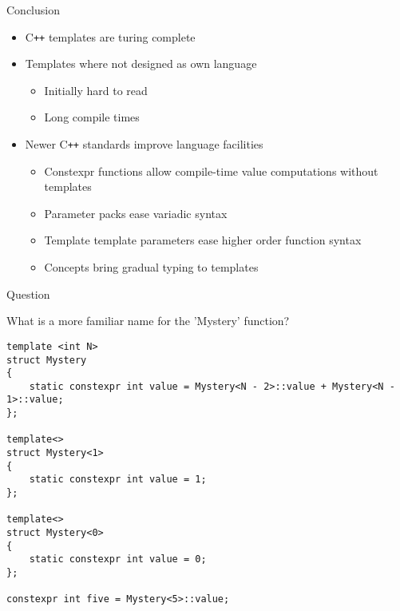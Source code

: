 \documentclass[aspectratio=169]{beamer}
\begin{document}

\begin{frame}{Conclusion}
    \begin{itemize}
        \item C\texttt{++} templates are turing complete
        \item Templates where not designed as own language
        
        \begin{itemize}
            \item Initially hard to read
            \item Long compile times
        \end{itemize}
        
        \item Newer C\texttt{++} standards improve language facilities
            \begin{itemize}
                \item Constexpr functions allow compile-time value computations without templates
                \item Parameter packs ease variadic syntax
                \item Template template parameters ease higher order function syntax
                \item Concepts bring gradual typing to templates
            \end{itemize}
    \end{itemize}
\end{frame}


\begin{frame}[fragile]{Question}
    
    What is a more familiar name for the 'Mystery' function?
    \scriptsize
    \begin{block}{}
        \begin{verbatim}
template <int N>
struct Mystery
{
    static constexpr int value = Mystery<N - 2>::value + Mystery<N - 1>::value;
};

template<>
struct Mystery<1>
{
    static constexpr int value = 1;
};

template<>
struct Mystery<0>
{
    static constexpr int value = 0;
};

constexpr int five = Mystery<5>::value;
        \end{verbatim}
    \end{block}
\end{frame}
\end{document}
